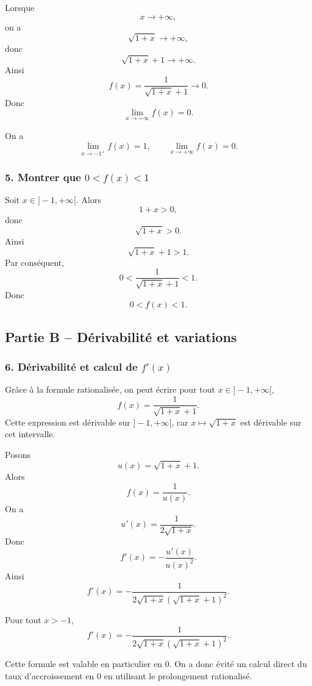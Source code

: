 \documentclass[11pt,a4paper]{article}
\begin{document}
Lorsque
\[
x\to+\infty,
\]
on a
\[
\sqrt{1+x}\to+\infty,
\]
donc
\[
\sqrt{1+x}+1\to+\infty.
\]
Ainsi
\[
f(x)=\frac1{\sqrt{1+x}+1}\to 0.
\]
Donc
\[
\lim_{x\to+\infty}f(x)=0.
\]

\begin{resultatbox}
On a
\[
\lim_{x\to -1^+}f(x)=1,
\qquad
\lim_{x\to+\infty}f(x)=0.
\]
\end{resultatbox}


\subsubsection*{5. Montrer que \(0<f(x)<1\)}

Soit \(x\in]-1,+\infty[\). Alors
\[
1+x>0,
\]
donc
\[
\sqrt{1+x}>0.
\]
Ainsi
\[
\sqrt{1+x}+1>1.
\]
Par conséquent,
\[
0<\frac1{\sqrt{1+x}+1}<1.
\]
Donc
\[
0<f(x)<1.
\]


\subsection*{Partie B -- Dérivabilité et variations}

\subsubsection*{6. Dérivabilité et calcul de \(f'(x)\)}

Grâce à la formule rationalisée, on peut écrire pour tout \(x\in]-1,+\infty[\),
\[
f(x)=\frac1{\sqrt{1+x}+1}.
\]
Cette expression est dérivable sur \(]-1,+\infty[\), car \(x\mapsto \sqrt{1+x}\) est dérivable sur cet intervalle.

Posons
\[
u(x)=\sqrt{1+x}+1.
\]
Alors
\[
f(x)=\frac1{u(x)}.
\]
On a
\[
u'(x)=\frac1{2\sqrt{1+x}}.
\]
Donc
\[
f'(x)=-\frac{u'(x)}{u(x)^2}.
\]
Ainsi
\[
f'(x)
=
-\frac{1}{2\sqrt{1+x}(\sqrt{1+x}+1)^2}.
\]

\begin{resultatbox}
Pour tout \(x>-1\),
\[
f'(x)
=
-\frac{1}{2\sqrt{1+x}(\sqrt{1+x}+1)^2}.
\]
\end{resultatbox}

\begin{remarquebox}
Cette formule est valable en particulier en \(0\). On a donc évité un calcul direct du taux d'accroissement en \(0\) en utilisant le prolongement rationalisé.
\end{remarquebox}
\end{document}
